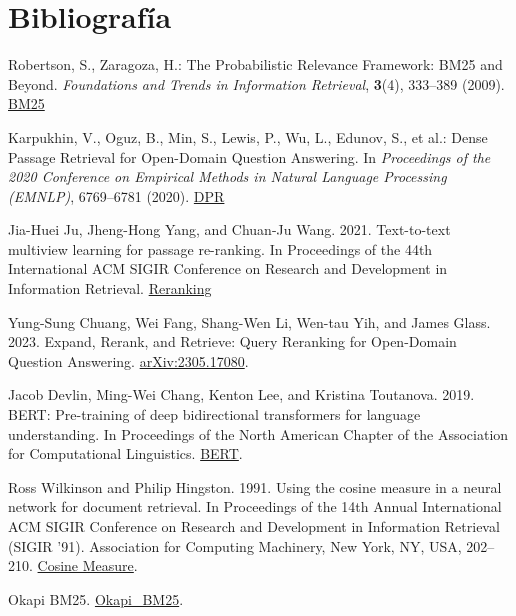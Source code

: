 \documentclass[runningheads]{llncs}
\begin{document}
\section{Bibliografía}
\begin{thebibliography}{8}

Robertson, S., Zaragoza, H.: The Probabilistic Relevance Framework: BM25 and Beyond. \emph{Foundations and Trends in Information Retrieval}, \textbf{3}(4), 333--389 (2009). \href{https://www.researchgate.net/publication/220613776_The_Probabilistic_Relevance_Framework_BM25_and_Beyond}{BM25}

Karpukhin, V., Oguz, B., Min, S., Lewis, P., Wu, L., Edunov, S., et al.: Dense Passage Retrieval for Open-Domain Question Answering. In \emph{Proceedings of the 2020 Conference on Empirical Methods in Natural Language Processing (EMNLP)}, 6769--6781 (2020). \href{https://arxiv.org/abs/2004.04906}{DPR}

Jia-Huei Ju, Jheng-Hong Yang, and Chuan-Ju Wang. 2021. Text-to-text multiview learning for passage re-ranking. In Proceedings of the 44th International ACM SIGIR Conference on Research and Development in Information Retrieval. \href{https://arxiv.org/abs/2104.14133}{Reranking}

Yung-Sung Chuang, Wei Fang, Shang-Wen Li, Wen-tau Yih, and James Glass. 2023. Expand, Rerank, and Retrieve: Query Reranking for Open-Domain Question Answering. \href{https://arxiv.org/abs/2305.17080}{arXiv:2305.17080}.

Jacob Devlin, Ming-Wei Chang, Kenton Lee, and Kristina Toutanova. 2019. BERT: Pre-training of deep bidirectional transformers for language understanding. In Proceedings of the North American Chapter of the Association for Computational Linguistics. \href{https://api.semanticscholar.org/CorpusID:52967399}{BERT}.

Ross Wilkinson and Philip Hingston. 1991. Using the cosine measure in a neural network for document retrieval. In Proceedings of the 14th Annual International ACM SIGIR Conference on Research and Development in Information Retrieval (SIGIR '91). Association for Computing Machinery, New York, NY, USA, 202–210. \href{https://doi.org/10.1145/122860.122880}{Cosine Measure}.


Okapi BM25. \href{https://es.wikipedia.org/wiki/Okapi_BM25}
{Okapi_BM25}.

\end{thebibliography}
\end{document}
